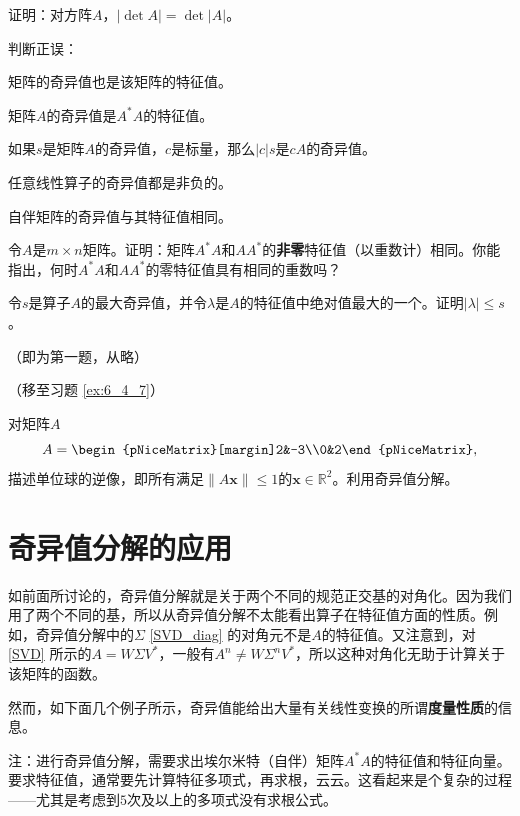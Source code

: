 \begin{problemset}
\begin{probenumerate}
    \end{probenumerate}
    \item 证明：对方阵$A$，$|\det A|=\det |A|$。
    \item 判断正误：
    \begin{probenumerate}
        \item 矩阵的奇异值也是该矩阵的特征值。
        \item 矩阵$A$的奇异值是$A^*A$的特征值。
        \item 如果$s$是矩阵$A$的奇异值，$c$是标量，那么$|c|s$是$cA$的奇异值。
        \item 任意线性算子的奇异值都是非负的。
        \item 自伴矩阵的奇异值与其特征值相同。
    \end{probenumerate}
    \item 令$A$是$m\times n$矩阵。证明：矩阵$A^*A$和$AA^*$的{\bf 非零}特征值（以重数计）相同。你能指出，何时$A^*A$和$AA^*$的零特征值具有相同的重数吗？
    \item 令$s$是算子$A$的最大奇异值，并令$\lambda$是$A$的特征值中绝对值最大的一个。证明$|\lambda|\le s$。
    \item （即为第一题，从略）
    \item （移至习题 \ref{ex:6_4_7}）
    \item 对矩阵$A$\[A=\begin{pNiceMatrix}[margin]2&-3\\0&2\end{pNiceMatrix},\]
    描述单位球的逆像，即所有满足$\|A\mathbf{x}\|\le 1$的$\mathbf{x}\in\mathbb{R}^2$。利用奇异值分解。
\end{problemset}

\section{奇异值分解的应用}

\enlargethispage{1.5em}

如前面所讨论的，奇异值分解就是关于两个不同的规范正交基的对角化。因为我们用了两个不同的基，所以从奇异值分解不太能看出算子在特征值方面的性质。例如，奇异值分解中的$\Sigma$  \eqref{SVD_diag} 的对角元不是$A$的特征值。又注意到，对 \eqref{SVD} 所示的$A=W\Sigma V^*$，一般有$A^n\ne W\Sigma^n V^*$，所以这种对角化无助于计算关于该矩阵的函数。

然而，如下面几个例子所示，奇异值能给出大量有关线性变换的所谓{\bf 度量性质}的信息。

注：进行奇异值分解，需要求出埃尔米特（自伴）矩阵$A^*A$的特征值和特征向量。要求特征值，通常要先计算特征多项式，再求根，云云。这看起来是个复杂的过程——尤其是考虑到$5$次及以上的多项式没有求根公式。

